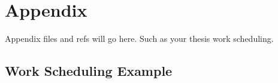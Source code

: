 
\section{Appendix} %
\label{sec:attachments}

Appendix files and refs will go here.
Such as your thesis work scheduling.

\subsection{Work Scheduling Example} %
\label{sub:work_scheduling}
